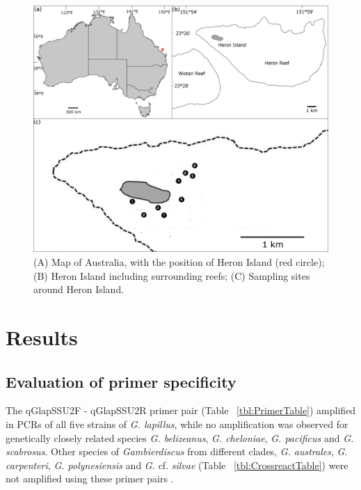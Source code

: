 \documentclass[12pt]{article}
\begin{document}
\begin{figure} 
\includegraphics[scale=1.7]{Hero_qpcr-figs/Fig1_Heron_sample-map_May18.png} 
\caption{(A) Map of Australia, with the position of Heron Island (red circle); (B) Heron Island including surrounding reefs; (C) Sampling sites around Heron Island.} 
\label{fig:samplesites}
\end{figure} 


\newpage
\section*{Results}
\subsection*{Evaluation of primer specificity}
\FloatBarrier
The qGlapSSU2F - qGlapSSU2R primer pair (Table ~\ref{tbl:PrimerTable}) amplified in PCRs of all five strains of \emph{G. lapillus}, while no amplification was observed for genetically closely related species \emph{G. belizeanus}, \emph{G. cheloniae}, \emph{G. pacificus} and \emph{G. scabrosus}. 
Other species of \emph{Gambierdiscus} from different clades, \emph{G. australes}, \emph{G. carpenteri}, \emph{G. polynesiensis} and \emph{G.} cf. \emph{silvae} (Table ~\ref{tbl:CrossreactTable}) were not amplified using these primer pairs \citep{smith2016new,kretzschmar2017characterization}.
\end{document}
